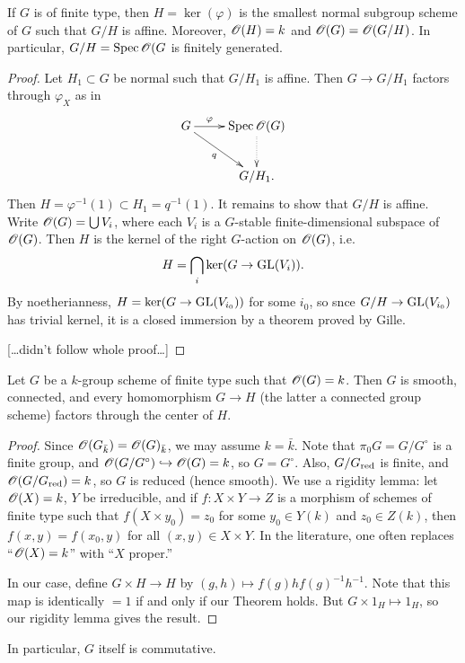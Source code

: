 \documentclass{article}
\begin{document}
\begin{theorem}
If $G$ is of finite type, then $H=\ker(\varphi)$ is the smallest normal subgroup 
scheme of $G$ such that $G/H$ is affine. Moreover, $\mathscr{O}(H)=k$ and 
$\mathscr{O}(G)=\mathscr{O}(G/H)$. In particular, $G/H=\operatorname{Spec} \mathscr{O}(G$ is finitely generated. 
\end{theorem}
\begin{proof}
Let $H_1\subset G$ be normal such that $G/H_1$ is affine. Then 
$G\to G/H_1$ factors through $\varphi_X$ as in 
\[\xymatrix{
  G \ar[r]^-\varphi \ar[dr]_-q 
    & \spectrum \sO(G) \ar@{.>}[d] \\
  & G/H_1 .
}\]
Then $H=\varphi^{-1}(1) \subset H_1=q^{-1}(1)$. It remains to show that $G/H$ is 
affine. Write $\mathscr{O}(G)=\bigcup V_i$, where each $V_i$ is a $G$-stable finite-dimensional 
subspace of $\mathscr{O}(G)$. Then $H$ is the kernel of the right $G$-action on 
$\mathscr{O}(G)$, i.e. 
\[
  H = \bigcap_i \ker(G \to \operatorname{GL}(V_i)) .
\]
By noetherianness, $H=\ker(G\to \operatorname{GL}(V_{i_0}))$ for some $i_0$, 
so snce $G/H \to \operatorname{GL}(V_{i_0})$ has trivial kernel, it is a 
closed immersion by a theorem proved by Gille. 

[\ldots didn't follow whole proof\ldots]
\end{proof}

\begin{theorem}
Let $G$ be a $k$-group scheme of finite type such that $\mathscr{O}(G)=k$. Then $G$ 
is smooth, connected, and every homomorphism $G\to H$ (the latter a connected 
group scheme) factors through the center of $H$. 
\end{theorem}
\begin{proof}
Since $\mathscr{O}(G_{\bar k}) = \mathscr{O}(G)_{\bar k}$, we may assume $k=\bar k$. Note that 
$\pi_0 G = G/G^\circ$ is a finite group, and 
$\mathscr{O}(G/G^\circ)\hookrightarrow \mathscr{O}(G)=k$, so $G=G^\circ$. Also, 
$G/G_{\mathrm{red}}$ is finite, and $\mathscr{O}(G/G_{\mathrm{red}})=k$, so $G$ is reduced (hence 
smooth). We use a rigidity lemma: let $\mathscr{O}(X)=k$, $Y$ be irreducible, and 
if $f:X\times Y\to Z$ is a morphism of schemes 
of finite type such that $f(X\times y_0)=z_0$ for some $y_0\in Y(k)$ and 
$z_0\in Z(k)$, then $f(x,y) = f(x_0,y)$ for all $(x,y)\in X\times Y$. In the 
literature, one often replaces ``$\mathscr{O}(X)=k$'' with ``$X$ proper.'' 

In our case, define $G\times H \to H$ by $(g,h)\mapsto f(g) h f(g)^{-1} h^{-1}$. 
Note that this map is identically $=1$ if and only if our Theorem holds. But 
$G\times 1_H\mapsto 1_H$, so our rigidity lemma gives the result. 
\end{proof}
In particular, $G$ itself is commutative. 
\end{document}
